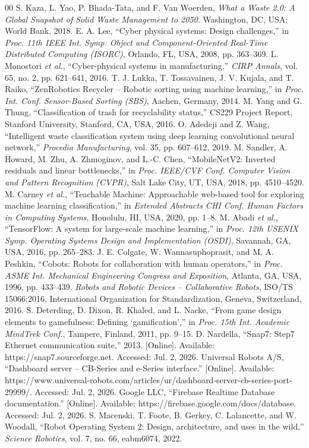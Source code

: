 \documentclass[conference]{IEEEtran}
\begin{document}
\begin{thebibliography}{00}
 S. Kaza, L. Yao, P. Bhada-Tata, and F. Van Woerden, \emph{What a Waste 2.0: A Global Snapshot of Solid Waste Management to 2050}. Washington, DC, USA: World Bank, 2018.
 E. A. Lee, ``Cyber physical systems: Design challenges,'' in \emph{Proc. 11th IEEE Int. Symp. Object and Component-Oriented Real-Time Distributed Computing (ISORC)}, Orlando, FL, USA, 2008, pp. 363--369.
 L. Monostori \emph{et al.}, ``Cyber-physical systems in manufacturing,'' \emph{CIRP Annals}, vol. 65, no. 2, pp. 621--641, 2016.
 T. J. Lukka, T. Tossavainen, J. V. Kujala, and T. Raiko, ``ZenRobotics Recycler -- Robotic sorting using machine learning,'' in \emph{Proc. Int. Conf. Sensor-Based Sorting (SBS)}, Aachen, Germany, 2014.
 M. Yang and G. Thung, ``Classification of trash for recyclability status,'' CS229 Project Report, Stanford University, Stanford, CA, USA, 2016.
 O. Adedeji and Z. Wang, ``Intelligent waste classification system using deep learning convolutional neural network,'' \emph{Procedia Manufacturing}, vol. 35, pp. 607--612, 2019.
 M. Sandler, A. Howard, M. Zhu, A. Zhmoginov, and L.-C. Chen, ``MobileNetV2: Inverted residuals and linear bottlenecks,'' in \emph{Proc. IEEE/CVF Conf. Computer Vision and Pattern Recognition (CVPR)}, Salt Lake City, UT, USA, 2018, pp. 4510--4520.
 M. Carney \emph{et al.}, ``Teachable Machine: Approachable web-based tool for exploring machine learning classification,'' in \emph{Extended Abstracts CHI Conf. Human Factors in Computing Systems}, Honolulu, HI, USA, 2020, pp. 1--8.
 M. Abadi \emph{et al.}, ``TensorFlow: A system for large-scale machine learning,'' in \emph{Proc. 12th USENIX Symp. Operating Systems Design and Implementation (OSDI)}, Savannah, GA, USA, 2016, pp. 265--283.
 J. E. Colgate, W. Wannasuphoprasit, and M. A. Peshkin, ``Cobots: Robots for collaboration with human operators,'' in \emph{Proc. ASME Int. Mechanical Engineering Congress and Exposition}, Atlanta, GA, USA, 1996, pp. 433--439.
 \emph{Robots and Robotic Devices -- Collaborative Robots}, ISO/TS 15066:2016, International Organization for Standardization, Geneva, Switzerland, 2016.
 S. Deterding, D. Dixon, R. Khaled, and L. Nacke, ``From game design elements to gamefulness: Defining `gamification','' in \emph{Proc. 15th Int. Academic MindTrek Conf.}, Tampere, Finland, 2011, pp. 9--15.
 D. Nardella, ``Snap7: Step7 Ethernet communication suite,'' 2013. [Online]. Available: https://snap7.sourceforge.net. Accessed: Jul. 2, 2026.
 Universal Robots A/S, ``Dashboard server -- CB-Series and e-Series interface.'' [Online]. Available: https://www.universal-robots.com/articles/ur/dashboard-server-cb-series-port-29999/. Accessed: Jul. 2, 2026.
 Google LLC, ``Firebase Realtime Database documentation.'' [Online]. Available: https://firebase.google.com/docs/database. Accessed: Jul. 2, 2026.
 S. Macenski, T. Foote, B. Gerkey, C. Lalancette, and W. Woodall, ``Robot Operating System 2: Design, architecture, and uses in the wild,'' \emph{Science Robotics}, vol. 7, no. 66, eabm6074, 2022.
\end{thebibliography}
\end{document}
